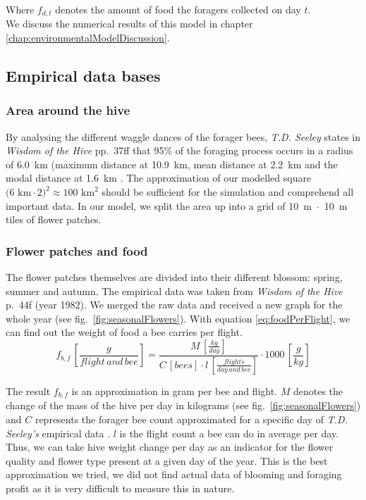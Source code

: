 			Where $f_{d,t}$ denotes the amount of food the foragers collected on day $t$.\\
			
			We discuss the numerical results of this model in chapter \ref{chap:environmentalModelDiscussion}.
		
	\subsection{Empirical data bases}
		\label{chap:empiricalDataBases}
		\subsubsection{Area around the hive}
			\label{chap:areaAroundTheHive}
			By analysing the different waggle dances of the forager bees, \textit{T.D. Seeley} states in \textit{Wisdom of the Hive} pp.~37ff that 95\% of the foraging process occurs in a radius of 6.0~km (maximum distance at 10.9~km, mean distance at 2.2~km and the modal distance at 1.6~km \cite{seeley95}. The approximation of our modelled square $\text{(6~km}\cdot\text{2)}^2 \approx \text{100~km}^2$ should be sufficient for the simulation and comprehend all important data. In our model, we split the area up into a grid of 10~m~$\cdot$~10~m tiles of flower patches.
			
		\subsubsection{Flower patches and food}
			\label{chap:flowerPatchesAndFood}
			The flower patches themselves are divided into their different blossom: spring, summer and autumn. The empirical data was taken from \textit{Wisdom of the Hive} p.~44f (year 1982). We merged the raw data and received a new graph for the whole year (see fig.~\ref{fig:seasonalFlowers}). With equation \ref{eq:foodPerFlight}, we can find out the weight of food a bee carries per flight.
			\begin{equation}\label{eq:foodPerFlight}
						f_{b,f} \,[\frac{g}{flight\, and\, bee}] = \frac{M \,[\frac{kg}{day}]}{C \,[bees] \cdot l \,[\frac{flights}{day \,and\, bee}]}\cdot 1000 \,[\frac{g}{kg}]
			\end{equation}
			
			The result $f_{b,f}$ is an approximation in gram per bee and flight. $M$ denotes the change of the mass of the hive per day in kilograms (see fig.~\ref{fig:seasonalFlowers}) and $C$ represents the forager bee count approximated for a specific day of \textit{T.D. Seeley's} empirical data \cite{seeley95}. $l$ is the flight count a bee can do in average per day. Thus, we can take hive weight change per day as an indicator for the flower quality and flower type present at a given day of the year. This is the best approximation we tried, we did not find actual data of blooming and foraging profit as it is very difficult to measure this in nature.
			

